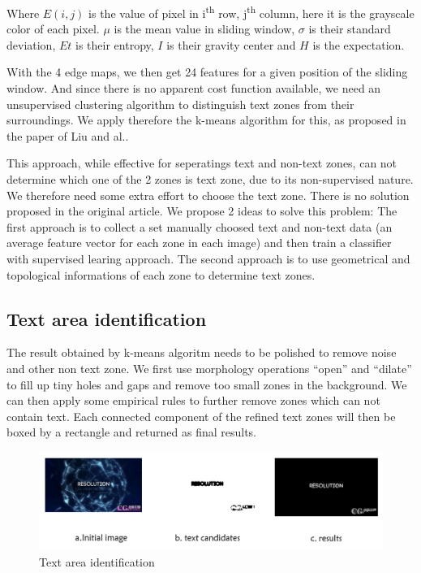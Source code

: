 \documentclass[paper=a4, french, 11pt]{scrartcl}
\begin{document}
Where $E(i,j)$ is the value of pixel in i\textsuperscript{th} row, j\textsuperscript{th} column, here it is the grayscale color of each pixel. $\mu$ is the mean value in sliding window, $\sigma$ is their standard deviation, $ Et$ is their entropy, $ I$  is their gravity center and $ H$ is the expectation.

With the 4 edge maps, we then get 24 features for a given position of the sliding window. And since there is no apparent cost function available, we need an unsupervised clustering algorithm to distinguish text zones from their surroundings. We apply therefore the k-means algorithm for this, as proposed in the paper of Liu and al..

This approach, while effective for seperatings text and non-text zones, can not determine which one of the 2 zones is text zone, due to its non-supervised nature. We therefore need some extra effort to choose the text zone. There is no solution proposed in the original article. We propose 2 ideas to solve this problem: The first approach is to collect a set manually choosed text and non-text data (an average feature vector for each zone in each image) and then train a classifier with supervised learing approach. The second approach is to use geometrical and topological informations of each zone to determine text zones.

\subsection{Text area identification}
The result obtained by k-means algoritm needs to be polished to remove noise and other non text zone. We first use morphology operations “open” and “dilate” to fill up tiny holes and gaps and remove too small zones in the background. We can then apply some empirical rules to further remove zones which can not contain text. Each connected component of the refined text zones will then be boxed by a rectangle and returned as final results.

\begin{figure}[h]
\begin{center}
   \includegraphics[width=0.9\linewidth]{text_area_example.png}
\end{center}
\vspace{-4ex}
\caption{Text area identification}
\label{fig:heatmap}
\end{figure}
\end{document}
